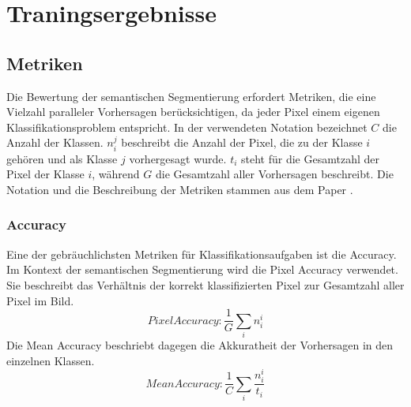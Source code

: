 \documentclass[12pt,DIV=15,BCOR=15mm,twoside,headsepline,abstract=true,listof=totoc,bibliography=totoc]{scrreprt}
\theoremstyle{remark}    %
\begin{document}
    \section{Traningsergebnisse}

    \subsection{Metriken}

    Die Bewertung der semantischen Segmentierung erfordert Metriken, die eine Vielzahl paralleler Vorhersagen berücksichtigen, da jeder Pixel einem eigenen 
    Klassifikationsproblem entspricht. 
    In der verwendeten Notation bezeichnet $C$ die Anzahl der Klassen. $n_i^j$ beschreibt die Anzahl der Pixel, die zu der Klasse $i$ gehören und als Klasse $j$ vorhergesagt wurde. 
    $t_i$ steht für die Gesamtzahl der Pixel der Klasse $i$, während $G$ die Gesamtzahl aller Vorhersagen beschreibt. Die Notation und die Beschreibung 
    der Metriken stammen aus dem Paper \cite{csurka2023semanticimagesegmentationdecades}.
    \subsubsection{Accuracy}
    Eine der gebräuchlichsten Metriken für Klassifikationsaufgaben ist die Accuracy.
    Im Kontext der semantischen Segmentierung wird die Pixel Accuracy verwendet. Sie beschreibt das Verhältnis der korrekt klassifizierten Pixel zur Gesamtzahl 
    aller Pixel im Bild.
    \begin{equation*}
        Pixel Accuracy: \frac{1}{G} \sum_{i} n_i^i
    \end{equation*}
    Die Mean Accuracy beschriebt dagegen die Akkuratheit der Vorhersagen in den einzelnen Klassen.
    \begin{equation*}
        Mean Accuracy: \frac{1}{C} \sum_{i} \frac{n_{i}^i}{t_i}
    \end{equation*}
\end{document}

